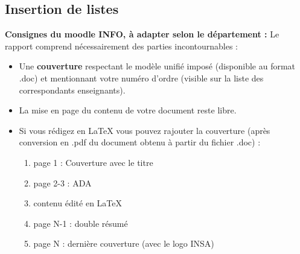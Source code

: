 \documentclass{rapportCS}
\begin{document}
\subsection{Insertion de listes}
\textbf{Consignes du moodle INFO, à adapter selon le département :}
\newline
Le rapport comprend nécessairement des parties incontournables :
\begin{itemize}[label=$\bullet$] %
    \item Une \textbf{couverture} respectant le modèle unifié imposé (disponible au format .doc) et mentionnant votre numéro d'ordre (visible sur la liste des correspondants enseignants). 
    \item La mise en page du contenu de votre document reste libre.
    \item Si vous rédigez en LaTeX vous pouvez rajouter la couverture (après conversion en .pdf du document obtenu à partir du fichier .doc) :
         \begin{enumerate}
            \item page 1 : Couverture avec le titre
            \item page 2-3 : ADA
            \item contenu édité en LaTeX
            \item page N-1 : double résumé 
            \item page N : dernière couverture (avec le logo INSA)
        \end{enumerate}


\end{itemize}
\end{document}
